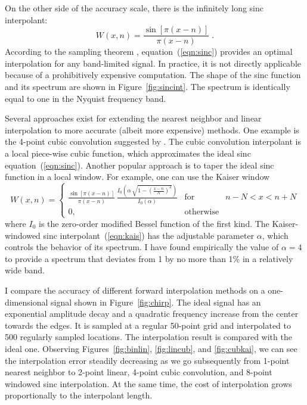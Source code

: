 \par
On the other side of the accuracy scale, there is the infinitely long
sinc interpolant:
\begin{equation}\label{eqn:sinc}
  W (x, n) = \frac{\sin \left[\pi (x - n) \right]}{\pi (x - n)} \;.
\end{equation}
According to the sampling theorem \cite{kotelnikov,shannon},
equation~(\ref{eqn:sinc}) provides an optimal interpolation for any
band-limited signal. In practice, it is not directly applicable
because of a prohibitively expensive computation. The shape of the sinc
function and its spectrum are shown in Figure~\ref{fig:sincint}. The
spectrum is identically equal to one in the Nyquist frequency band.

\par
Several approaches exist for extending the nearest neighbor and linear
interpolation to more accurate (albeit more expensive) methods. One
example is the 4-point cubic convolution suggested by .
The cubic convolution interpolant is a local piece-wise cubic
function, which approximates the ideal sinc equation~(\ref{eqn:sinc}).
Another popular approach is to taper the ideal sinc function in a
local window. For example, one can use the Kaiser window \cite{kaiser}
\begin{equation}
  \label{eqn:kais}
  W (x, n) = \left\{\begin{array}{lcr} \displaystyle
      \frac{\sin \left[\pi (x - n) \right]}{\pi (x - n)}\,
      \frac{I_0\left(\alpha\,\sqrt{1-\left(\frac{x-n}{N}\right)^2}\right)}
      {I_0(\alpha)} & \mbox{for} & n - N < x < n + N \\
      0, & \mbox{otherwise} &
\end{array}\right.
\end{equation}
where $I_0$ is the zero-order modified Bessel function of the first
kind.  The Kaiser-windowed sinc interpolant~(\ref{eqn:kais}) has the
adjustable parameter $\alpha$, which controls the behavior of its
spectrum. I have found empirically the value of $\alpha=4$ to provide
a spectrum that deviates from 1 by no more than 1\% in a relatively
wide band.
\par
I compare the accuracy of different forward interpolation methods on a
one-dimensional signal shown in Figure~\ref{fig:chirp}. The ideal
signal has an exponential amplitude decay and a quadratic frequency
increase from the center towards the edges. It is sampled at a regular
50-point grid and interpolated to 500 regularly sampled locations. The
interpolation result is compared with the ideal one. Observing
Figures~\ref{fig:binlin}, \ref{fig:lincub}, and \ref{fig:cubkai}, we
can see the interpolation error steadily decreasing as we go
subsequently from 1-point nearest neighbor to 2-point linear, 4-point
cubic convolution, and 8-point windowed sinc interpolation. At the
same time, the cost of interpolation grows proportionally to the
interpolant length.

